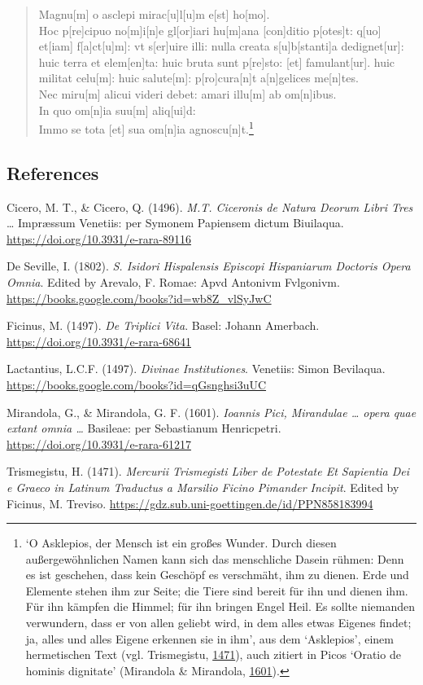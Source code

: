 \documentclass[
]{article}
\begin{document}
\begin{quote}
Magnu{[}m{]} o asclepi mirac{[}u{]}l{[}u{]}m e{[}st{]} ho{[}mo{]}.\\
Hoc p{[}re{]}cipuo no{[}m{]}i{[}n{]}e gl{[}or{]}iari hu{[}m{]}ana
{[}con{]}ditio p{[}otes{]}t: q{[}uo{]} et{[}iam{]}
f{[}a{]}ct{[}u{]}m{]}: vt s{[}er{]}uire illi: nulla creata
s{[}u{]}b{[}stanti{]}a dedignet{[}ur{]}: huic terra et elem{[}en{]}ta:
huic bruta sunt p{[}re{]}sto: {[}et{]} famulant{[}ur{]}. huic militat
celu{[}m{]}: huic salute{[}m{]}: p{[}ro{]}cura{[}n{]}t a{[}n{]}gelices
me{[}n{]}tes.\\
Nec miru{[}m{]} alicui videri debet: amari illu{[}m{]} ab
om{[}n{]}ibus.\\
In quo om{[}n{]}ia suu{[}m{]} aliq{[}ui{]}d:\\
Immo se tota {[}et{]} sua om{[}n{]}ia agnoscu{[}n{]}t.\footnote{`O
  Asklepios, der Mensch ist ein großes Wunder. Durch diesen
  außergewöhnlichen Namen kann sich das menschliche Dasein rühmen: Denn
  es ist geschehen, dass kein Geschöpf es verschmäht, ihm zu dienen.
  Erde und Elemente stehen ihm zur Seite; die Tiere sind bereit für ihn
  und dienen ihm. Für ihn kämpfen die Himmel; für ihn bringen Engel
  Heil. Es sollte niemanden verwundern, dass er von allen geliebt wird,
  in dem alles etwas Eigenes findet; ja, alles und alles Eigene erkennen
  sie in ihm', aus dem `Asklepios', einem hermetischen Text (vgl.
  Trismegistu,
  \href{https://gdz.sub.uni-goettingen.de/id/PPN858183994}{1471}), auch
  zitiert in Picos `Oratio de hominis dignitate' (Mirandola \&
  Mirandola, \href{https://doi.org/10.3931/e-rara-61217}{1601}).}
\end{quote}

\hypertarget{references}{%
\subsection{References}\label{references}}

Cicero, M. T., \& Cicero, Q. (1496). \emph{M.T. Ciceronis de Natura
Deorum Libri Tres} \ldots{} Impræssum Venetiis: per Symonem Papiensem
dictum Biuilaqua. \url{https://doi.org/10.3931/e-rara-89116}

De Seville, I. (1802). \emph{S. Isidori Hispalensis Episcopi Hispaniarum
Doctoris Opera Omnia}. Edited by Arevalo, F. Romae: Apvd Antonivm
Fvlgonivm. \url{https://books.google.com/books?id=wb8Z_vlSyJwC}

Ficinus, M. (1497). \emph{De Triplici Vita}. Basel: Johann Amerbach.
\url{https://doi.org/10.3931/e-rara-68641}

Lactantius, L.C.F. (1497). \emph{Divinae Institutiones}. Venetiis: Simon
Bevilaqua. \url{https://books.google.com/books?id=qGsnghsi3uUC}

Mirandola, G., \& Mirandola, G. F. (1601). \emph{Ioannis Pici,
Mirandulae \ldots{} opera quae extant omnia \ldots{}} Basileae: per
Sebastianum Henricpetri. \url{https://doi.org/10.3931/e-rara-61217}

Trismegistu, H. (1471). \emph{Mercurii Trismegisti Liber de Potestate Et
Sapientia Dei e Graeco in Latinum Traductus a Marsilio Ficino Pimander
Incipit}. Edited by Ficinus, M. Treviso.
\url{https://gdz.sub.uni-goettingen.de/id/PPN858183994}
\end{document}
